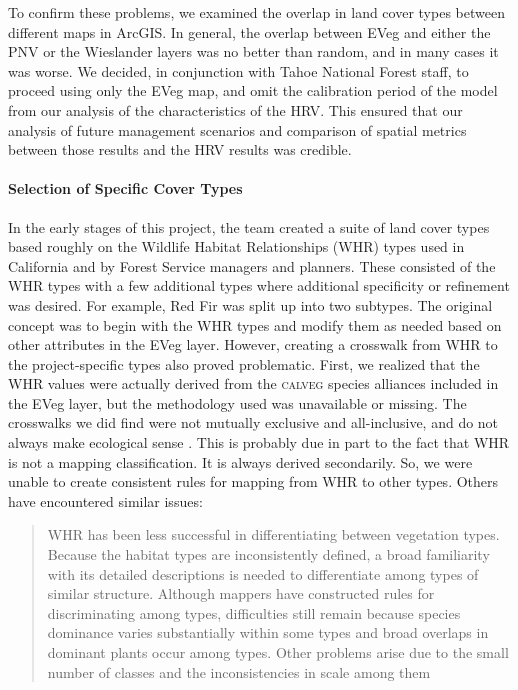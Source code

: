 To confirm these problems, we examined the overlap in land cover types between different maps in ArcGIS. In general, the overlap between EVeg and either the PNV or the Wieslander layers was no better than random, and in many cases it was worse. We decided, in conjunction with Tahoe National Forest staff, to proceed using only the EVeg map, and omit the calibration period of the model from our analysis of the characteristics of the HRV. This ensured that our analysis of future management scenarios and comparison of spatial metrics between those results and the HRV results was credible.

\paragraph{Selection of Specific Cover Types}
In the early stages of this project, the team created a suite of land cover types based roughly on the Wildlife Habitat Relationships (WHR) types used in California and by Forest Service managers and planners. These consisted of the WHR types with a few additional types where additional specificity or refinement was desired. For example, Red Fir was split up into two subtypes. The original concept was to begin with the WHR types and modify them as needed based on other attributes in the EVeg layer. However, creating a crosswalk from WHR to the project-specific types also proved problematic. First, we realized that the WHR values were actually derived from the \textsc{calveg} species alliances included in the EVeg layer, but the methodology used was unavailable or missing. The crosswalks we did find were not mutually exclusive and all-inclusive, and do not always make ecological sense \citep{Keeler-Wolf2007,DeBecker1988,Game2005}. This is probably due in part to the fact that WHR is not a mapping classification. It is always derived secondarily. So, we were unable to create consistent rules for mapping from WHR to other types. Others have encountered similar issues:
%
\begin{quote}
WHR has been less successful in differentiating between vegetation types. Because the habitat types are inconsistently defined, a broad familiarity with its detailed descriptions is needed to differentiate among types of similar structure. Although mappers have constructed rules for discriminating among types, difficulties still remain because species dominance varies substantially within some types and broad overlaps in dominant plants occur among types. Other problems arise due to the small number of classes and the inconsistencies in scale among them \citep[p.~23]{Keeler-Wolf2007}
\end{quote}

